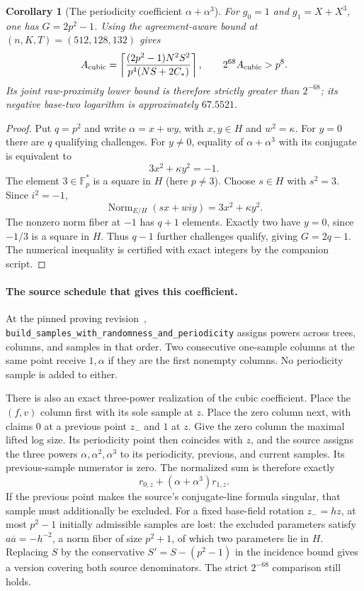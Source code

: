 \documentclass[11pt,letterpaper]{article}
\newtheorem{corollary}[theorem]{Corollary}
\theoremstyle{definition}
\theoremstyle{remark}
\begin{document}
\begin{corollary}[The periodicity coefficient $\alpha+\alpha^3$]
\label{cor:cubic-schedule}
For $g_0=1$ and $g_1=X+X^3$, one has $G=2p^2-1$.
Using the agreement-aware bound at $(n,K,T)=(512,128,132)$ gives
\[
 A_{\rm cubic}=\left\lceil
 \frac{(2p^2-1)N^2S^2}{p^4(NS+2C_*)}\right\rceil,
 \qquad
 2^{68}A_{\rm cubic}>p^8.
\]
Its joint raw-proximity lower bound is therefore strictly greater than
$2^{-68}$; its negative base-two logarithm is approximately $67.5521$.
\end{corollary}
\begin{proof}
Put $q=p^2$ and write $\alpha=x+wy$, with $x,y\in H$ and $w^2=\kappa$.
For $y=0$ there are $q$ qualifying challenges. For $y\ne0$, equality
of $\alpha+\alpha^3$ with its conjugate is equivalent to
\[
 3x^2+\kappa y^2=-1.
\]
The element $3\in\mathbb F_p^*$ is a square in $H$ (here $p\ne3$).
Choose $s\in H$ with $s^2=3$. Since $i^2=-1$,
\[
 \operatorname{Norm}_{E/H}(sx+wiy)=3x^2+\kappa y^2.
\]
The nonzero norm fiber at $-1$ has $q+1$ elements. Exactly two have
$y=0$, since $-1/3$ is a square in $H$. Thus $q-1$ further challenges
qualify, giving $G=2q-1$. The numerical inequality is certified with
exact integers by the companion script.
\end{proof}

\paragraph{The source schedule that gives this coefficient.}
At the pinned proving revision~\cite{proving},
\texttt{build\_samples\_with\_randomness\_and\_periodicity} assigns
powers across trees, columns, and samples in that order. Two consecutive
one-sample columns at the same point receive $1,\alpha$ if they are the
first nonempty columns. No periodicity sample is added to either.

There is also an exact three-power realization of the cubic coefficient.
Place the $(f,v)$ column first with its sole sample at $z$. Place the
zero column next, with claims $0$ at a previous point $z_-$ and $1$ at
$z$. Give the zero column the maximal lifted log size. Its periodicity
point then coincides with $z$, and the source assigns the three powers
$\alpha,\alpha^2,\alpha^3$ to its periodicity, previous, and current
samples. Its previous-sample numerator is zero. The normalized sum is
therefore exactly
\[
 r_{0,z}+(\alpha+\alpha^3)r_{1,z}.
\]
If the previous point makes the source's conjugate-line formula
singular, that sample must additionally be excluded. For a fixed
base-field rotation $z_-=hz$, at most $p^2-1$ initially admissible
samples are lost: the excluded parameters satisfy
$a\overline a=-h^{-2}$, a norm fiber of size $p^2+1$, of which two
parameters lie in $H$. Replacing $S$ by the conservative
$S'=S-(p^2-1)$ in the incidence bound gives a version covering both
source denominators. The strict $2^{-68}$ comparison still holds.
\end{document}
